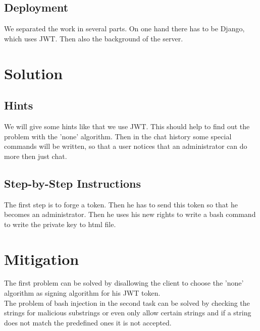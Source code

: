 \documentclass[12pt,a4paper]{article}
\begin{document}
\subsection{Deployment}
We separated the work in several parts. On one hand there has to be Django, which uses JWT. Then also the background of the server.

\section{Solution}

\subsection{Hints}
We will give some hints like that we use JWT. This should help to find out the problem with the 'none' algorithm. Then in the chat history some special commands will be written, so that a user notices that an administrator can do more then just chat.
\subsection{Step-by-Step Instructions}
The first step is to forge a token. Then he has to send this token so that he becomes an administrator. Then he uses his new rights to write a bash command to write the private key to html file.
\section{Mitigation}

The first problem can be solved by disallowing the client to choose the 'none' algorithm as signing algorithm for his JWT token.
\\
The problem of bash injection in the second task can be solved by checking the strings for malicious substrings or even only allow certain strings and if a string does not match the predefined ones it is not accepted.
\end{document}
